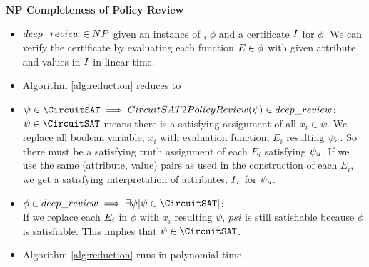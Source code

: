  \textbf{NP Completeness of Policy Review} 
\begin{itemize}
	\item $deep\_review \in NP$
		 given an instance of \simpleReview,   $\phi$  and a certificate $I$ for $\phi$. We can verify the certificate by evaluating each function $E \in \phi$ with given attribute and values in $I$ in linear time. 
		
	\item Algorithm \ref{alg:reduction}  reduces \CircuitSAT{} to \simpleReview

	\item $\psi \in \CircuitSAT \implies \reductionAlgo(\psi) \in \simpleReview$:
		    $\psi  \in \CircuitSAT$ means there is a satisfying assignment of all $x_i \in \psi$. We replace all boolean variable, $x_i$ with evaluation function, $E_i$ resulting $\psi_{u}$. So there must be a satisfying truth assignment of each $E_i$ satisfying $\psi_{u}$. If we use the same (attribute, value) pairs as used in the construction of each $E_i$, we get a satisfying interpretation of attributes, $I_x$ for $\psi_{u}$.
	\item $ \phi \in \simpleReview \implies \exists \psi [ \psi \in \CircuitSAT]$:	\\
		   If we replace each $E_i$ in $\phi$ with $x_i$ resulting $\psi$, $psi$ is still satisfiable because $\phi$ is satisfiable. This implies that $\psi \in \CircuitSAT$. 
		
	\item Algorithm \ref{alg:reduction} runs in polynomial time. 
\end{itemize}